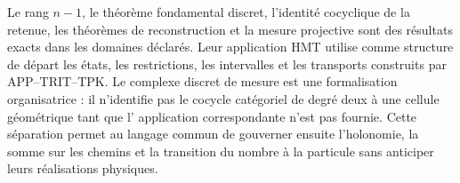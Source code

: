 \begin{statusbox}[title={Force mathématique et fonction architecturale}]
Le rang \(n-1\), le théorème fondamental discret, l'identité cocyclique de la
retenue, les théorèmes de reconstruction et la mesure projective sont des résultats
exacts dans les domaines déclarés. Leur application HMT utilise comme structure de départ les états,
les restrictions, les intervalles et les transports construits par APP--TRIT--TPK. Le
complexe discret de mesure est une formalisation organisatrice : il n'identifie pas
le cocycle catégoriel de degré deux à une cellule géométrique tant que l'
application correspondante n'est pas fournie. Cette séparation permet au langage
commun de gouverner ensuite l'holonomie, la somme sur les chemins et la transition du
nombre à la particule sans anticiper leurs réalisations physiques.
\end{statusbox}
